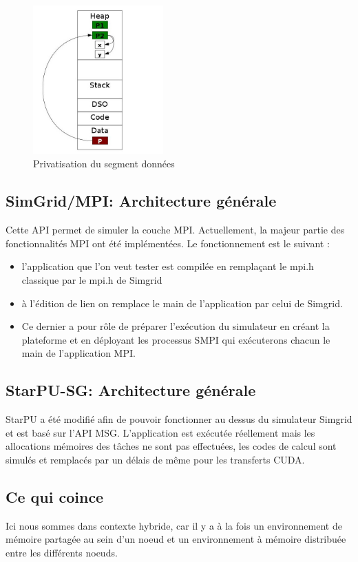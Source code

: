 \documentclass[smallextended]{svjour3}
\begin{document}
\begin{figure}[htb]
\centering
\includegraphics[width=5cm]{./Img/Memoire.jpg}
\caption{\label{fig:1}Privatisation du segment données}
\end{figure}

\subsection{SimGrid/MPI: Architecture générale}
\label{sec-3-2}
Cette API permet de simuler la couche MPI. Actuellement, la majeur
partie des fonctionnalités MPI ont été implémentées. 
Le fonctionnement est le suivant :
\begin{itemize}
\item l'application que l'on veut tester est compilée en remplaçant
le mpi.h classique par le mpi.h de Simgrid
\item à l'édition de lien on remplace le main de l'application par
celui de Simgrid.
\item Ce dernier a pour rôle de préparer l'exécution du simulateur
en créant la plateforme et en déployant les processus SMPI qui
exécuterons chacun le main de l'application MPI.
\end{itemize}

\subsection{StarPU-SG: Architecture générale}
\label{sec-3-3}
StarPU a été modifié afin de pouvoir fonctionner au dessus du
simulateur Simgrid et est basé sur l'API MSG. L'application est
exécutée réellement mais les allocations mémoires des tâches ne
sont pas effectuées, les codes de calcul sont simulés et remplacés
par un délais de même pour les transferts CUDA.

\subsection{Ce qui coince}
\label{sec-3-4}
Ici nous sommes dans contexte hybride, car il y a à la fois un
environnement de mémoire partagée au sein d'un noeud et un
environnement à mémoire distribuée entre les différents noeuds.  
\end{document}
